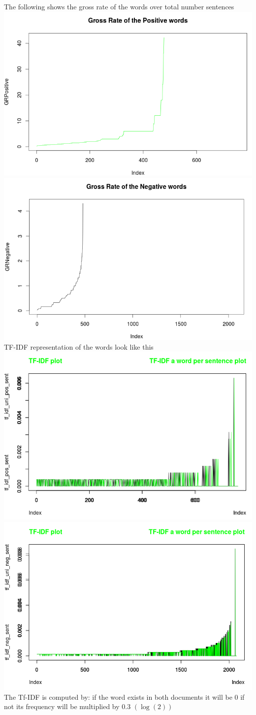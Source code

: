 \documentclass{article}
\begin{document}
The following shows the gross rate of the words over total number sentences \\
\includegraphics[width=0.7\linewidth]{vic_GR_sent_pos.png}\includegraphics[width=0.7\linewidth]{vic_GR_sent_neg.png}\\
TF-IDF representation of the words look like this\\
\includegraphics[width=0.7\linewidth]{TF_IDF_pos.png}\\
\includegraphics[width=0.7\linewidth]{TF_IDF_neg.png}\\
The Tf-IDF is computed by: if the word exists in both documents it will be $0$ if not its frequency will be multiplied by 0.3 $(\log(2))$
\end{document}

